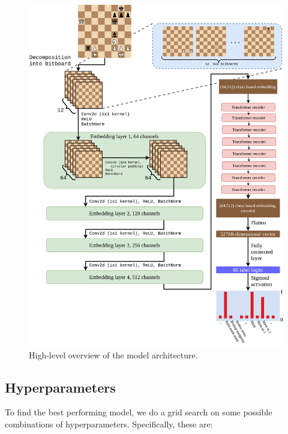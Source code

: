 \begin{figure}[H]
        \centering
        \includegraphics[width=\textwidth]{project/img/ml_diagram.png}
        \caption{High-level overview of the model architecture.}
        \label{MLDiagram}
\end{figure}

\subsection{Hyperparameters}\label{mlS22}

To find the best performing model, we do a grid search on some possible
combinations of hyperparameters. Specifically, these are:

